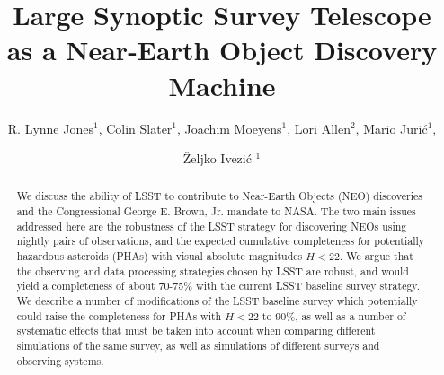 \documentclass[12pt,preprint]{aastex}
\begin{document}
\title{Large Synoptic Survey Telescope as a Near-Earth Object Discovery Machine}

\author{R. Lynne Jones$^1$, Colin Slater$^1$, Joachim Moeyens$^1$, 
Lori Allen$^2$, Mario Juri\'{c}$^1$,  \and \v{Z}eljko Ivezi\'{c} $^1$}


\begin{abstract}
We discuss the ability of LSST to contribute to Near-Earth Objects (NEO) discoveries and
the Congressional George E. Brown, Jr. mandate to NASA. The two main issues addressed 
here are the robustness of the LSST strategy for discovering NEOs using nightly pairs of 
observations, and the expected cumulative completeness for potentially hazardous asteroids
(PHAs) with visual absolute magnitudes $H<22$.  We argue that the observing and data 
processing strategies chosen by LSST are robust, and would yield a completeness of about 
70-75\% with the current LSST baseline survey strategy. We describe a number of modifications of the 
LSST baseline survey which potentially could raise the completeness for PHAs with $H<22$
to 90\%, as well as a number of systematic effects that must be taken into account when
comparing different simulations of the same survey, as well as simulations of different
surveys and observing systems. 
\end{abstract}



 

 



 



 

\appendix


% 


\end{document}
